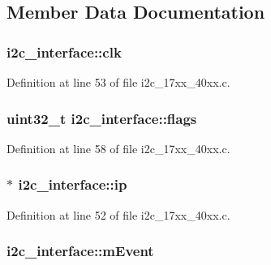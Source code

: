 \subsection{Member Data Documentation}
\subsubsection[{\texorpdfstring{clk}{clk}}]{ i2c\+\_\+interface\+::clk}\hypertarget{structi2c__interface_a98a5ec32b8f77360ac136e09db8a9821}{}\label{structi2c__interface_a98a5ec32b8f77360ac136e09db8a9821}


Definition at line 53 of file i2c\+\_\+17xx\+\_\+40xx.\+c.

\subsubsection[{\texorpdfstring{flags}{flags}}]{\setlength{\rightskip}{0pt plus 5cm}uint32\+\_\+t i2c\+\_\+interface\+::flags}\hypertarget{structi2c__interface_a8b1e70d8de79970bd3e61e67e59e15a2}{}\label{structi2c__interface_a8b1e70d8de79970bd3e61e67e59e15a2}


Definition at line 58 of file i2c\+\_\+17xx\+\_\+40xx.\+c.

\subsubsection[{\texorpdfstring{ip}{ip}}]{$\ast$ i2c\+\_\+interface\+::ip}\hypertarget{structi2c__interface_a3081afc519201026e2c06217a5c71eef}{}\label{structi2c__interface_a3081afc519201026e2c06217a5c71eef}


Definition at line 52 of file i2c\+\_\+17xx\+\_\+40xx.\+c.

\subsubsection[{\texorpdfstring{m\+Event}{mEvent}}]{ i2c\+\_\+interface\+::m\+Event}\hypertarget{structi2c__interface_ac9762dcaee633a0121320763422eabdf}{}\label{structi2c__interface_ac9762dcaee633a0121320763422eabdf}


